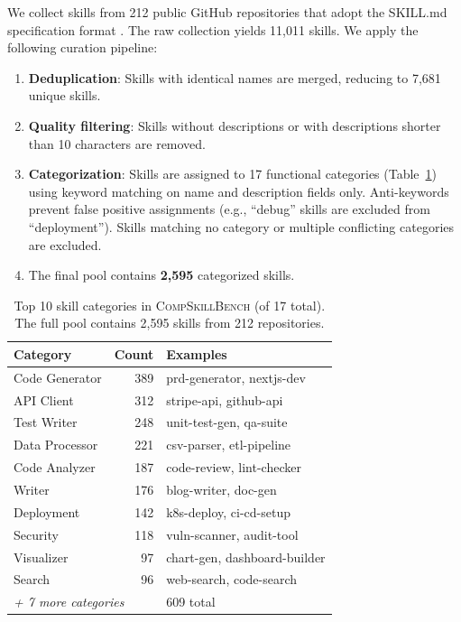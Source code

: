 \documentclass[11pt]{article}
\newcommand{\benchmark}{\textsc{CompSkillBench}}
\begin{document}
We collect skills from 212 public GitHub repositories that adopt the SKILL.md specification format \cite{anthropic2025skills}.
The raw collection yields 11{,}011 skills.
We apply the following curation pipeline:

\begin{enumerate}[nosep,leftmargin=*]
  \item \textbf{Deduplication}: Skills with identical names are merged, reducing to 7{,}681 unique skills.
  \item \textbf{Quality filtering}: Skills without descriptions or with descriptions shorter than 10 characters are removed.
  \item \textbf{Categorization}: Skills are assigned to 17 functional categories (Table~\ref{tab:categories}) using keyword matching on name and description fields only.
  Anti-keywords prevent false positive assignments (e.g., ``debug'' skills are excluded from ``deployment'').
  Skills matching no category or multiple conflicting categories are excluded.
  \item The final pool contains \textbf{2{,}595} categorized skills.
\end{enumerate}

\begin{table}[t]
\centering
\small
\setlength{\tabcolsep}{4pt}
\begin{tabular}{lrl}
\toprule
\textbf{Category} & \textbf{Count} & \textbf{Examples} \\
\midrule
Code Generator & 389 & prd-generator, nextjs-dev \\
API Client & 312 & stripe-api, github-api \\
Test Writer & 248 & unit-test-gen, qa-suite \\
Data Processor & 221 & csv-parser, etl-pipeline \\
Code Analyzer & 187 & code-review, lint-checker \\
Writer & 176 & blog-writer, doc-gen \\
Deployment & 142 & k8s-deploy, ci-cd-setup \\
Security & 118 & vuln-scanner, audit-tool \\
Visualizer & 97 & chart-gen, dashboard-builder \\
Search & 96 & web-search, code-search \\
\midrule
\multicolumn{2}{l}{\textit{+ 7 more categories}} & 609 total \\
\bottomrule
\end{tabular}
\caption{Top 10 skill categories in \benchmark{} (of 17 total). The full pool contains 2{,}595 skills from 212 repositories.}
\label{tab:categories}
\end{table}
\end{document}
